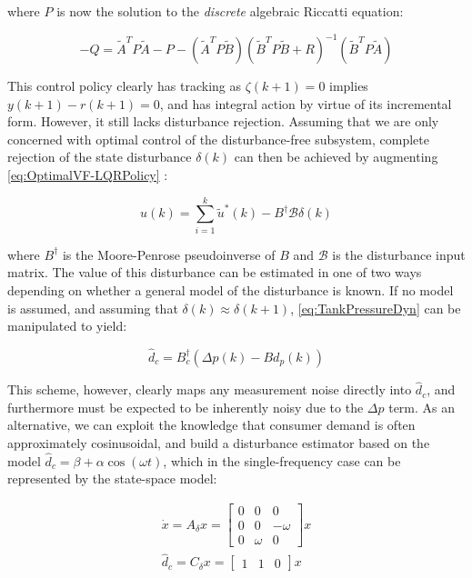 where $P$ is now the solution to the \textit{discrete} algebraic Riccatti equation:

\begin{equation}\label{eq:DARE}
	-Q = \tilde{A}^TP\tilde{A} - P - (\tilde{A}^TP\tilde{B})(\tilde{B}^TP\tilde{B}+R)^{-1}(\tilde{B}^TP\tilde{A})
\end{equation}

This control policy clearly has tracking as $\zeta(k+1) = 0$ implies $y(k+1)-r(k+1) = 0$, and has integral action by virtue of its incremental form. However, it still lacks disturbance rejection. Assuming that we are only concerned with optimal control of the disturbance-free subsystem, complete rejection of the state disturbance $\delta(k)$ can then be achieved by augmenting \cref{eq:OptimalVF-LQRPolicy} \cite{Singh2017}:

\begin{equation}
	u(k) = \sum_{i=1}^{k} \tilde{u}^*(k) - B^\dagger \mathcal{B}\delta(k)
\end{equation}

where $B^\dagger$ is the Moore-Penrose pseudoinverse of $B$ and $\mathcal{B}$ is the disturbance input matrix. The value of this disturbance can be estimated in one of two ways depending on whether a general model of the disturbance is known. If no model is assumed, and assuming that $\delta(k) \approx \delta(k+1)$, \cref{eq:TankPressureDyn} can be manipulated to yield:

\begin{equation}\label{eq:AgnosticDisturbanceEstimation}
	\hat{d}_c = B_c^\dagger (\Delta p(k) - Bd_p(k))
\end{equation}

This scheme, however, clearly maps any measurement noise directly into $\hat{d}_c$, and furthermore must be expected to be inherently noisy due to the $\Delta p$ term. As an alternative, we can exploit the knowledge that consumer demand is often approximately cosinusoidal, and build a disturbance estimator based on the model $\hat{d}_c = \beta + \alpha\cos(\omega t)$, which in the single-frequency case can be represented by the state-space model:

\begin{equation}\label{eq:TheisticDisturbanceEstimator}
	\begin{gathered}
		\dot{x} = A_\delta x =  \begin{bmatrix}0 & 0 & 0 \\ 0 & 0 & -\omega \\ 0 & \omega & 0	\end{bmatrix}x \\
		\hat{d}_c = C_\delta x = \begin{bmatrix} 1 & 1 & 0 \end{bmatrix} x
	\end{gathered}
\end{equation}

